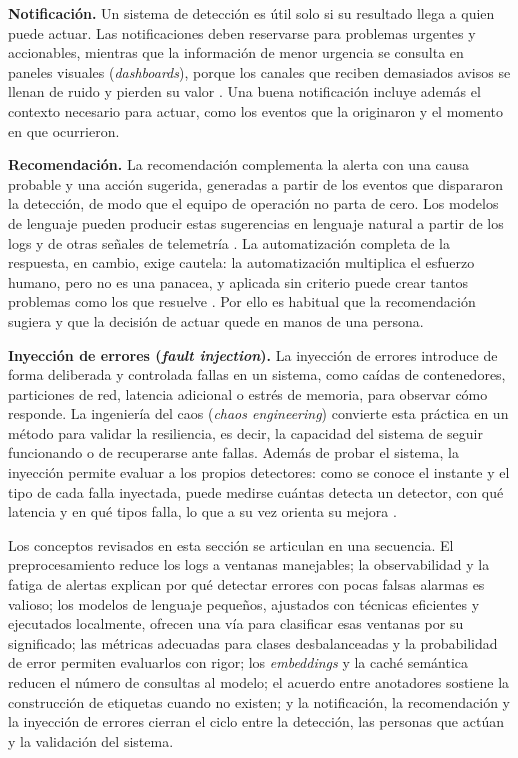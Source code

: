 \textbf{Notificación.} Un sistema de detección es útil solo si su resultado llega a quien puede actuar. Las notificaciones deben reservarse para problemas urgentes y accionables, mientras que la información de menor urgencia se consulta en paneles visuales (\textit{dashboards}), porque los canales que reciben demasiados avisos se llenan de ruido y pierden su valor \cite{ewaschuk2016_sre_monitoring}. Una buena notificación incluye además el contexto necesario para actuar, como los eventos que la originaron y el momento en que ocurrieron.

\textbf{Recomendación.} La recomendación complementa la alerta con una causa probable y una acción sugerida, generadas a partir de los eventos que dispararon la detección, de modo que el equipo de operación no parta de cero. Los modelos de lenguaje pueden producir estas sugerencias en lenguaje natural a partir de los logs y de otras señales de telemetría \cite{wang2025_cloudnative_rca}. La automatización completa de la respuesta, en cambio, exige cautela: la automatización multiplica el esfuerzo humano, pero no es una panacea, y aplicada sin criterio puede crear tantos problemas como los que resuelve \cite{murphy2016_sre_automation}. Por ello es habitual que la recomendación sugiera y que la decisión de actuar quede en manos de una persona.

\textbf{Inyección de errores (\textit{fault injection}).} La inyección de errores introduce de forma deliberada y controlada fallas en un sistema, como caídas de contenedores, particiones de red, latencia adicional o estrés de memoria, para observar cómo responde. La ingeniería del caos (\textit{chaos engineering}) convierte esta práctica en un método para validar la resiliencia, es decir, la capacidad del sistema de seguir funcionando o de recuperarse ante fallas. Además de probar el sistema, la inyección permite evaluar a los propios detectores: como se conoce el instante y el tipo de cada falla inyectada, puede medirse cuántas detecta un detector, con qué latencia y en qué tipos falla, lo que a su vez orienta su mejora \cite{pedroso2025_maia}.

Los conceptos revisados en esta sección se articulan en una secuencia. El preprocesamiento reduce los logs a ventanas manejables; la observabilidad y la fatiga de alertas explican por qué detectar errores con pocas falsas alarmas es valioso; los modelos de lenguaje pequeños, ajustados con técnicas eficientes y ejecutados localmente, ofrecen una vía para clasificar esas ventanas por su significado; las métricas adecuadas para clases desbalanceadas y la probabilidad de error permiten evaluarlos con rigor; los \textit{embeddings} y la caché semántica reducen el número de consultas al modelo; el acuerdo entre anotadores sostiene la construcción de etiquetas cuando no existen; y la notificación, la recomendación y la inyección de errores cierran el ciclo entre la detección, las personas que actúan y la validación del sistema.

